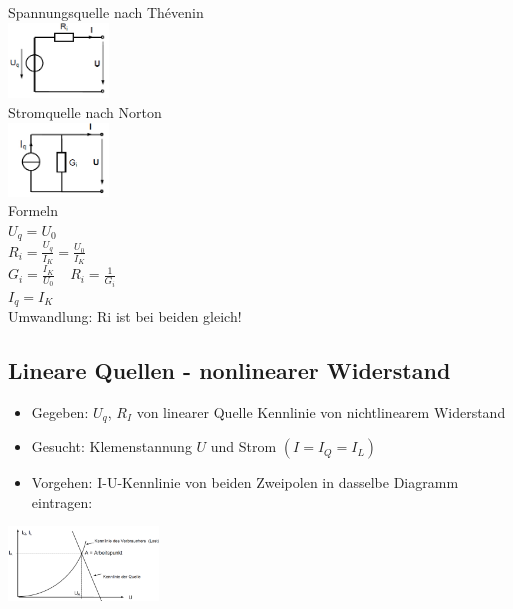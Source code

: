 \begin{multicols}{3}
Spannungsquelle nach Thévenin\\
\includegraphics[width=0.2\textwidth]{pics/dcnet/ersatz_spannung}\\
Stromquelle nach Norton\\
\includegraphics[width=0.2\textwidth]{pics/dcnet/ersatz_strom}\\
Formeln\\
$ U_q = U_0 $\\
$ R_i = \frac{U_q}{I_K} = \frac{U_0}{I_K} $\\
$ G_i = \frac{I_K}{U_0}\ \ \ \ \ R_i = \frac{1}{G_i}$\\
$ I_q = I_K $\\
Umwandlung: Ri ist bei beiden gleich!
\end{multicols}

\subsection{Lineare Quellen - nonlinearer Widerstand}
\begin{multicols}{2}
\begin{itemize}
\item Gegeben: $U_q$, $R_I$ von linearer Quelle Kennlinie von nichtlinearem Widerstand
\item Gesucht: Klemenstannung $U$ und Strom $(I = I_Q = I_L)$
\item Vorgehen: I-U-Kennlinie von beiden Zweipolen in dasselbe Diagramm eintragen:
\end{itemize}
\includegraphics[width=0.3\textwidth]{pics/quellen/nonlineUI}
\end{multicols}

